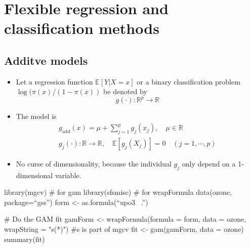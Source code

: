\section{Flexible regression and classification methods}
\subsection{Additve models}
\begin{theory}
\begin{itemize}
 \item Let a regression function $\mathbb{E}[Y|X = x]$ or a binary classification problem $\log(\pi(x)/(1-\pi(x))$ be denoted by 
 \begin{equation*}
  g(\cdot):\mathbb{R}^p\rightarrow\mathbb{R}
 \end{equation*}
 \item The model is
 \begin{gather*}
  g_{\text{add}}(x) = \mu + \sum_{j=1}^p g_j(x_j), \quad\mu\in\mathbb{R}\\
  g_j(\cdot): \mathbb{R}\rightarrow\mathbb{R},\quad\mathbb{E}[g_j(X_j)] = 0\quad (j=1,\cdots,p)
 \end{gather*}
 \item No curse of dimensionality, because the individual $g_j$ only depend on a 1-dimensional variable.
\end{itemize}
\end{theory}
\begin{code}
 library(mgcv) # for gam
 library(sfsmisc) # for wrapFormula
 data(ozone, package=``gss'')
 form <- as.formula(``upo3 ~.'')
 
 # Do the GAM fit
 gamForm <- wrapFormula(formula = form, data = ozone, wrapString = "s(*)") #s is part of mgcv
 fit <- gam(gamForm, data = ozone) 
 summary(fit)
\end{code}
